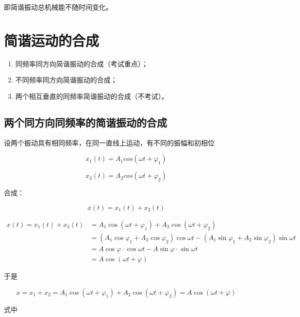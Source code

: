 \documentclass[12pt, a4paper]{article}
\numberwithin{equation}{section}
\begin{document}
    即简谐振动总机械能不随时间变化。

\section{简谐运动的合成}

    \begin{enumerate}
        \item 同频率同方向简谐振动的合成（考试重点）；
        \item 不同频率同方向简谐振动的合成；
        \item 两个相互垂直的同频率简谐振动的合成（不考试）。
    \end{enumerate}

\subsection{两个同方向同频率的简谐振动的合成}

    设两个振动具有相同频率，在同一直线上运动，有不同的振幅和初相位

    \[
        x_1\left(t\right) = A_1 cos\left(\omega t + \varphi_1\right)
    \]

    \[
        x_2\left(t\right) = A_2 cos\left(\omega t + \varphi_2\right)
    \]

    合成：

    \[
        x\left(t\right) = x_1\left(t\right) + x_2\left(t\right)
    \]

    $$
        \begin{aligned}
            x(t)=x_1(t)+x_2(t)& =A_1 \cos \left(\omega t+\varphi_1\right)+A_2 \cos \left(\omega t+\varphi_2\right) \\
            & =\left(A_1 \cos \varphi_1+A_2 \cos \varphi_2\right) \cos \omega t-\left(A_1 \sin \varphi_1+A_2 \sin \varphi_2\right) \sin \omega t \\
            & =A \cos \varphi \cdot \cos \omega t-A \sin \varphi \cdot \sin \omega t \\
            & =A \cos (\omega t+\varphi)
        \end{aligned}
    $$

    于是

    \begin{equation}
        x=x_1+x_2=A_1 \cos \left(\omega t+\varphi_1\right)+A_2 \cos \left(\omega t+\varphi_2\right)=A \cos (\omega t+\varphi)
    \end{equation}

    式中
\end{document}
